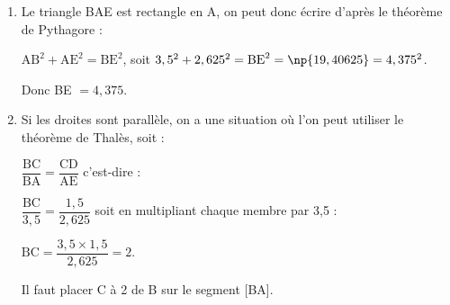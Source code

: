
\medskip

%
%

\begin{enumerate}
\item %
Le triangle BAE est rectangle en A, on peut donc écrire d'après le théorème de Pythagore :

$\text{AB}^2 + \text{AE}^2  = \text{BE}^2$, soit $3,5^2 + 2,625^2 = \text{BE}^2 = \np{19,40625} = 4,375^2$.

Donc BE $ = 4,375$.
\item %

Si les droites sont parallèle, on a une situation où l'on peut utiliser le théorème de Thalès, soit :

$\dfrac{\text{BC}}{\text{BA}} =  \dfrac{\text{CD}}{\text{AE}}$ c'est-dire :

$\dfrac{\text{BC}}{3,5} =  \dfrac{1,5}{2,625}$ soit en multipliant chaque membre par 3,5  :

$\text{BC} = \dfrac{3,5 \times 1,5}{2,625}  = 2$.

Il faut placer C à 2 de B sur le segment [BA].
\end{enumerate}

\bigskip

